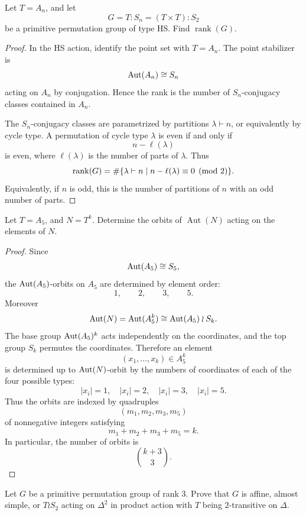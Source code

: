 \begin{exercise}
Let \(T = A_n\), and let
\[
    G = T:S_n = (T \times T):S_2
\]
be a primitive permutation group of type HS. Find \(\operatorname{rank}(G)\).
\end{exercise}

\begin{proof}
In the HS action, identify the point set with \(T=A_n\). The point stabilizer is
\[
    \operatorname{Aut}(A_n)\cong S_n
\]
acting on \(A_n\) by conjugation. Hence the rank is the number of
\(S_n\)-conjugacy classes contained in \(A_n\).

The \(S_n\)-conjugacy classes are parametrized by partitions \(\lambda\vdash n\),
or equivalently by cycle type. A permutation of cycle type \(\lambda\) is even
if and only if
\[
    n-\ell(\lambda)
\]
is even, where \(\ell(\lambda)\) is the number of parts of \(\lambda\). Thus
\[
    \operatorname{rank}(G)
    =
    \#\{\lambda\vdash n\mid n-\ell(\lambda)\equiv 0\pmod 2\}.
\]
Equivalently, if \(n\) is odd, this is the number of partitions of \(n\) with
an odd number of parts.
\end{proof}

\begin{exercise}
Let \(T = A_5\), and \(N = T^k\). Determine the orbits of
\(\operatorname{Aut}(N)\) acting on the elements of \(N\).
\end{exercise}

\begin{proof}
Since
\[
    \operatorname{Aut}(A_5)\cong S_5,
\]
the \(\operatorname{Aut}(A_5)\)-orbits on \(A_5\) are determined by element order:
\[
    1,\qquad 2,\qquad 3,\qquad 5.
\]
Moreover
\[
    \operatorname{Aut}(N)=\operatorname{Aut}(A_5^k)\cong \operatorname{Aut}(A_5)\wr S_k.
\]
The base group \(\operatorname{Aut}(A_5)^k\) acts independently on the coordinates, and the
top group \(S_k\) permutes the coordinates. Therefore an element
\[
    (x_1,\ldots,x_k)\in A_5^k
\]
is determined up to \(\operatorname{Aut}(N)\)-orbit by the numbers of coordinates of each of
the four possible types:
\[
    |x_i|=1,\quad |x_i|=2,\quad |x_i|=3,\quad |x_i|=5.
\]
Thus the orbits are indexed by quadruples
\[
    (m_1,m_2,m_3,m_5)
\]
of nonnegative integers satisfying
\[
    m_1+m_2+m_3+m_5=k.
\]
In particular, the number of orbits is
\[
    \binom{k+3}{3}.
\]
\end{proof}

\begin{exercise}
Let \(G\) be a primitive permutation group of rank \(3\). Prove that \(G\) is
affine, almost simple, or \(T \wr S_2\) acting on \(\Delta^2\) in product action
with \(T\) being \(2\)-transitive on \(\Delta\).
\end{exercise}

